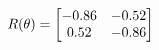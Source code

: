 \documentclass[preview]{standalone}
\begin{document}
\begin{align*}
\special{dvisvgm:raw <g id='unique000'>}R(\theta) = \begin{bmatrix}-0.86 & -0.52\\0.52 & -0.86\end{bmatrix}\special{dvisvgm:raw </g>}
\end{align*}
\end{document}
